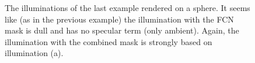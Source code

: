 \begin{figure}
	\centering
	
	\caption{The illuminations of the last example rendered on a sphere. It seems like (as in the previous example) the illumination with the FCN mask is dull and has no specular term (only ambient). Again, the illumination with the combined mask is strongly based on illumination (a).}
	\label{fig:chap4:bsp2_illumination}
\end{figure}


